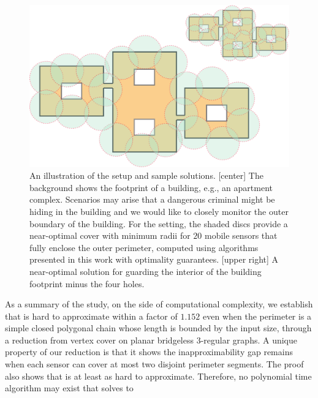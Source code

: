 

\begin{figure}[ht]
    \centering
		\vspace*{2mm}
    \includegraphics[width=\columnwidth]{chapters/osg/figures/example-0-eps-converted-to.pdf}
		\vspace*{1mm}
    \caption[An illustration of the \osgt setup and sample solutions]
		{An illustration of the \osgt setup and sample solutions.
		[center] The background shows the footprint of a building, e.g., an 
		apartment complex. Scenarios may arise that a dangerous criminal 
		might be hiding in the building and we would like to closely monitor 
		the outer boundary of the building.	For the setting, the shaded 
		discs provide a	near-optimal cover with minimum radii for $20$ 
		mobile sensors that fully enclose the outer perimeter, computed 
		using algorithms presented in this work with optimality guarantees. 
		[upper right] A near-optimal solution for guarding the interior of
		the building footprint minus the four holes.}
    \label{fig:example0}
\end{figure}
As a summary of the study, on the side of computational complexity, we 
establish that \opgt is hard to approximate within a factor of 
$1.152$
even when the perimeter is a simple closed polygonal chain whose length
is bounded by the input size, through a reduction from 
vertex cover on planar bridgeless $3$-regular graphs.
%
A unique property of our reduction is that it shows the inapproximability gap
remains when each sensor can cover at most two disjoint perimeter 
segments. 
%
The proof also shows that \orgt is at least as hard to approximate. 
Therefore, no polynomial time algorithm may exist that solves \osgt to 
